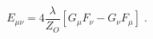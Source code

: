 \begin{equation}
\label{e5:2}
E_{\mu \nu}=4 \frac{\lambda}{Z_O}[G_{\mu}F_{\nu}-G_{\nu}F_{\mu}] \; .
\end{equation}

